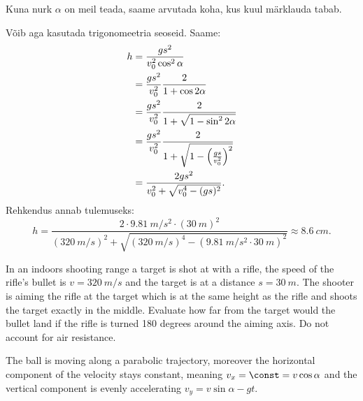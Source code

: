 Kuna nurk $\alpha$ on meil teada, saame arvutada koha, kus kuul märklauda tabab.

Võib aga kasutada trigonomeetria seoseid. Saame:
\begin{align*}
h & = {gs^2 \over v_{0}^2\cos^2\alpha}\\
& = {gs^2 \over v_{0}^2}{2 \over 1+\cos2\alpha}\\
& = {gs^2 \over v_{0}^2}{2 \over 1+\sqrt{1-\sin^2 2\alpha}}\\
& = {gs^2 \over v_{0}^2}{2 \over 1+\sqrt{1-\Big({gs \over v_0^2}\Big)^2}}\\
& = {2gs^2 \over v_0^2+\sqrt{v_0^4-(gs)^2}}.
\end{align*}
Rehkendus annab tulemuseks:
$$
h = \frac{2\cdot \SI{9,81}{m/s^2} \cdot (\SI{30}{m})^2}{(\SI{320}{m/s})^2+\sqrt{(\SI{320}{m/s})^4-(\SI{9,81}{m/s^2} \cdot \SI{30}{m})^2}} \approx \SI{8,6}{cm}.
$$

In an indoors shooting range a target is shot at with a rifle, the speed of the rifle’s bullet is $v=\SI{320}{m/s}$ and the target is at a distance $s=\SI{30}{m}$. The shooter is aiming the rifle at the target which is at the same height as the rifle and shoots the target exactly in the middle. Evaluate how far from the target would the bullet land if the rifle is turned 180 degrees around the aiming axis. Do not account for air resistance.

\hinteng
The ball is moving along a parabolic trajectory, moreover the horizontal component of the velocity stays constant, meaning $v_x = \const = v\cos\alpha$ and the vertical component is evenly accelerating $v_y = v\sin\alpha - gt$.

